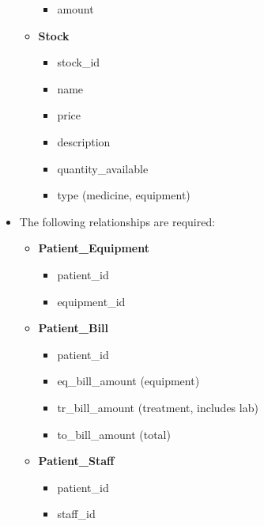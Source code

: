 \documentclass{article}
\begin{document}
\begin{itemize}
\begin{itemize}
\begin{itemize}
                    \item amount
                \end{itemize}
            \item \textbf{Stock}
                \begin{itemize}
                    \item {\color{blue}stock\_id}
                    \item name
                    \item price
                    \item description
                    \item quantity\_available
                    \item type (medicine, equipment)
                \end{itemize}
        \end{itemize}
    \item The following relationships are required:
        \begin{itemize}
            \item \textbf{Patient\_Equipment}
                \begin{itemize}
                    \item {\color{blue}patient\_id}
                    \item {\color{blue}equipment\_id}
                \end{itemize}
            \item \textbf{Patient\_Bill}
                \begin{itemize}
                    \item {\color{blue}patient\_id}
                    \item eq\_bill\_amount (equipment)
                    \item tr\_bill\_amount (treatment, includes lab)
                    \item to\_bill\_amount (total)
                \end{itemize}
            \item \textbf{Patient\_Staff}
                \begin{itemize}
                    \item {\color{blue}patient\_id}
                    \item {\color{blue}staff\_id}
                \end{itemize}
        \end{itemize}
\end{itemize}
\end{document}
